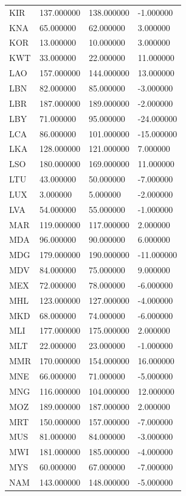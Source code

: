 \begin{tabular}{llll}
KIR & 137.000000 & 138.000000 & -1.000000 \\
KNA & 65.000000 & 62.000000 & 3.000000 \\
KOR & 13.000000 & 10.000000 & 3.000000 \\
KWT & 33.000000 & 22.000000 & 11.000000 \\
LAO & 157.000000 & 144.000000 & 13.000000 \\
LBN & 82.000000 & 85.000000 & -3.000000 \\
LBR & 187.000000 & 189.000000 & -2.000000 \\
LBY & 71.000000 & 95.000000 & -24.000000 \\
LCA & 86.000000 & 101.000000 & -15.000000 \\
LKA & 128.000000 & 121.000000 & 7.000000 \\
LSO & 180.000000 & 169.000000 & 11.000000 \\
LTU & 43.000000 & 50.000000 & -7.000000 \\
LUX & 3.000000 & 5.000000 & -2.000000 \\
LVA & 54.000000 & 55.000000 & -1.000000 \\
MAR & 119.000000 & 117.000000 & 2.000000 \\
MDA & 96.000000 & 90.000000 & 6.000000 \\
MDG & 179.000000 & 190.000000 & -11.000000 \\
MDV & 84.000000 & 75.000000 & 9.000000 \\
MEX & 72.000000 & 78.000000 & -6.000000 \\
MHL & 123.000000 & 127.000000 & -4.000000 \\
MKD & 68.000000 & 74.000000 & -6.000000 \\
MLI & 177.000000 & 175.000000 & 2.000000 \\
MLT & 22.000000 & 23.000000 & -1.000000 \\
MMR & 170.000000 & 154.000000 & 16.000000 \\
MNE & 66.000000 & 71.000000 & -5.000000 \\
MNG & 116.000000 & 104.000000 & 12.000000 \\
MOZ & 189.000000 & 187.000000 & 2.000000 \\
MRT & 150.000000 & 157.000000 & -7.000000 \\
MUS & 81.000000 & 84.000000 & -3.000000 \\
MWI & 181.000000 & 185.000000 & -4.000000 \\
MYS & 60.000000 & 67.000000 & -7.000000 \\
NAM & 143.000000 & 148.000000 & -5.000000 \\

\end{tabular}
